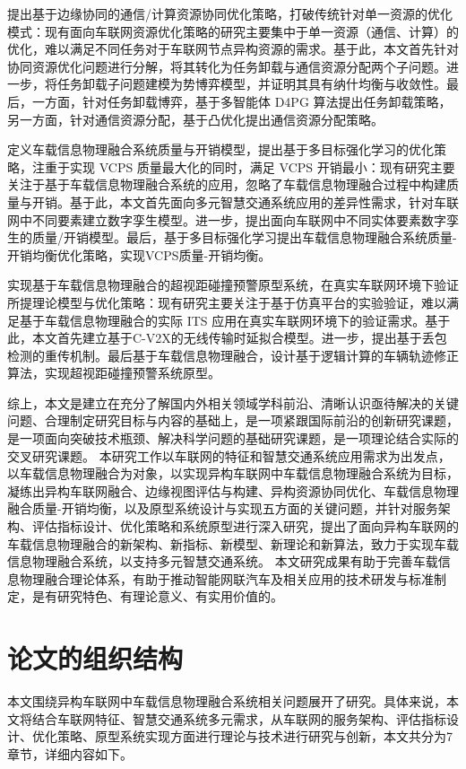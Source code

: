  提出基于边缘协同的通信/计算资源协同优化策略，打破传统针对单一资源的优化模式：现有面向车联网资源优化策略的研究主要集中于单一资源（通信、计算）的优化，难以满足不同任务对于车联网节点异构资源的需求。基于此，本文首先针对协同资源优化问题进行分解，将其转化为任务卸载与通信资源分配两个子问题。进一步，将任务卸载子问题建模为势博弈模型，并证明其具有纳什均衡与收敛性。最后，一方面，针对任务卸载博弈，基于多智能体 D4PG 算法提出任务卸载策略，另一方面，针对通信资源分配，基于凸优化提出通信资源分配策略。

 定义车载信息物理融合系统质量与开销模型，提出基于多目标强化学习的优化策略，注重于实现 VCPS 质量最大化的同时，满足 VCPS 开销最小：现有研究主要关注于基于车载信息物理融合系统的应用，忽略了车载信息物理融合过程中构建质量与开销。基于此，本文首先面向多元智慧交通系统应用的差异性需求，针对车联网中不同要素建立数字孪生模型。进一步，提出面向车联网中不同实体要素数字孪生的质量/开销模型。最后，基于多目标强化学习提出车载信息物理融合系统质量-开销均衡优化策略，实现VCPS质量-开销均衡。

 实现基于车载信息物理融合的超视距碰撞预警原型系统，在真实车联网环境下验证所提理论模型与优化策略：现有研究主要关注于基于仿真平台的实验验证，难以满足基于车载信息物理融合的实际 ITS 应用在真实车联网环境下的验证需求。基于此，本文首先建立基于C-V2X的无线传输时延拟合模型。进一步，提出基于丢包检测的重传机制。最后基于车载信息物理融合，设计基于逻辑计算的车辆轨迹修正算法，实现超视距碰撞预警系统原型。

综上，本文是建立在充分了解国内外相关领域学科前沿、清晰认识亟待解决的关键问题、合理制定研究目标与内容的基础上，是一项紧跟国际前沿的创新研究课题，是一项面向突破技术瓶颈、解决科学问题的基础研究课题，是一项理论结合实际的交叉研究课题。
本研究工作以车联网的特征和智慧交通系统应用需求为出发点，以车载信息物理融合为对象，以实现异构车联网中车载信息物理融合系统为目标，凝练出异构车联网融合、边缘视图评估与构建、异构资源协同优化、车载信息物理融合质量-开销均衡，以及原型系统设计与实现五方面的关键问题，并针对服务架构、评估指标设计、优化策略和系统原型进行深入研究，提出了面向异构车联网的车载信息物理融合的新架构、新指标、新模型、新理论和新算法，致力于实现车载信息物理融合系统，以支持多元智慧交通系统。
本文研究成果有助于完善车载信息物理融合理论体系，有助于推动智能网联汽车及相关应用的技术研发与标准制定，是有研究特色、有理论意义、有实用价值的。

\section{论文的组织结构}\label{section 1-7}
本文围绕异构车联网中车载信息物理融合系统相关问题展开了研究。具体来说，本文将结合车联网特征、智慧交通系统多元需求，从车联网的服务架构、评估指标设计、优化策略、原型系统实现方面进行理论与技术进行研究与创新，本文共分为7章节，详细内容如下。

